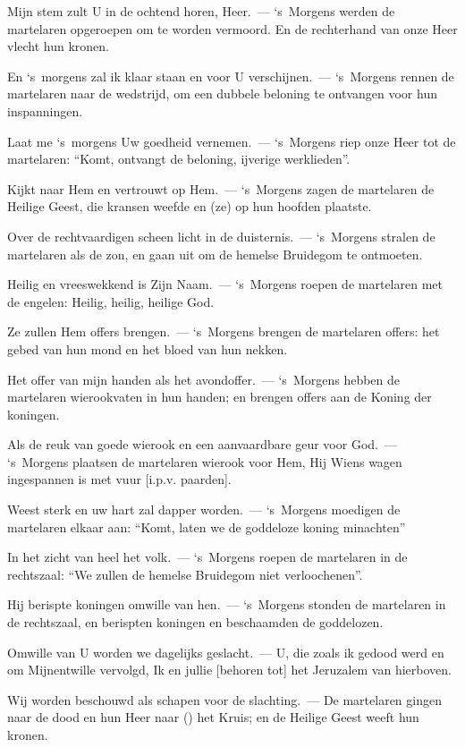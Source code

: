 \documentclass[12pt,twoside,a5paper]{article}
\begin{document}
\begin{halfparskip}
  Mijn stem zult U in de ochtend horen, Heer.~--- `s~Morgens werden de martelaren opgeroepen om te worden vermoord. En de rechterhand van onze Heer vlecht hun kronen.

  En `s~morgens zal ik klaar staan en voor U verschijnen.~--- `s~Morgens rennen de martelaren naar de wedstrijd, om een dubbele beloning te ontvangen voor hun inspanningen.

  Laat me `s~morgens Uw goedheid vernemen.~--- `s~Morgens riep onze Heer tot de martelaren: ``Komt, ontvangt de beloning, ijverige werklieden''.

  Kijkt naar Hem en vertrouwt op Hem.~--- `s~Morgens zagen de martelaren de Heilige Geest, die kransen weefde en (ze) op hun hoofden plaatste.

  Over de rechtvaardigen scheen licht in de duisternis.~--- `s~Morgens stralen de martelaren als de zon, en gaan uit om de hemelse Bruidegom te ontmoeten.

  Heilig en vreeswekkend is Zijn Naam.~--- `s~Morgens roepen de martelaren met de engelen: Heilig, heilig, heilige God.

  Ze zullen Hem offers brengen.~--- `s~Morgens brengen de martelaren offers: het gebed van hun mond en het bloed van hun nekken.

  Het offer van mijn handen als het avondoffer.~--- `s~Morgens hebben de martelaren wierookvaten in hun handen; en brengen offers aan de Koning der koningen.

  Als de reuk van goede wierook en een aanvaardbare geur voor God.~--- `s~Morgens plaatsen de martelaren wierook voor Hem, Hij Wiens wagen ingespannen is met vuur [i.p.v. paarden].

  Weest sterk en uw hart zal dapper worden.~--- `s~Morgens moedigen de martelaren elkaar aan: ``Komt, laten we de goddeloze koning minachten''

  In het zicht van heel het volk.~--- `s~Morgens roepen de martelaren in de rechtszaal: ``We zullen de hemelse Bruidegom niet verloochenen''.

  Hij berispte koningen omwille van hen.~--- `s~Morgens stonden de martelaren in de rechtszaal, en berispten koningen en beschaamden de goddelozen.

  Omwille van U worden we dagelijks geslacht.~--- U, die zoals ik gedood werd en om Mijnentwille vervolgd, Ik en jullie [behoren tot] het Jeruzalem van hierboven.

  Wij worden beschouwd als schapen voor de slachting.~--- De martelaren gingen naar  de dood en hun Heer naar () het Kruis; en de Heilige Geest weeft hun kronen.


\end{halfparskip}
\end{document}
